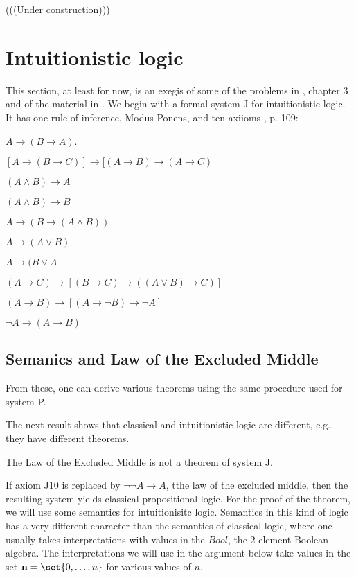 
(((Under construction)))


\section{Intuitionistic logic}

\innertableofcontents

This section, at least for now, is an exegis of some of the problems in \cite{RH}, chapter 3 and of the material in \cite{WKIL}.  We begin with a formal system J for intuitionistic logic. It has one rule of inference, Modus Ponens, and ten axiioms \cite{RH}, p. 109:

 $A \to (B \to A)$.

 $[A \to (B \to C)] \to [(A \to B) \to (A \to C) $

 $(A \land B) \to A$

 $(A \land B) \to B$

 $A \to (B \to (A \land B)) $

 $A \to (A \lor B)$

 $A \to (B \lor A$

 $(A \to C) \to [(B \to C) \to ((A \lor B) \to C)] $

 $(A \to B) \to [(A \to \neg B) \to \neg A ] $

 $\neg A \to (A \to B) $

\subsection{Semanics and Law of the Excluded Middle}

From these, one can derive various theorems using the same procedure used for system P.

The next result shows that classical  and intuitionistic logic are different, e.g., they have different theorems.

\begin{theorem}  \label{lem} The Law of the Excluded Middle is not a theorem of system J.
\end{theorem}


If axiom J10 is replaced by $\neg \neg A \to A$, tthe law of the excluded middle, then the resulting system yields classical propositional logic.
For the proof of the theorem, we will use some semantics for intuitionisitc logic.  Semantics in this kind of logic has a very different character than the semantics of classical logic, where one usually takes interpretations with values in the $Bool$, the 2-element Boolean algebra.  The interpretations we will use in the argument below take values in the set  $\mathbf{n} = \set{0, \ldots, n}$ for various values of $n$. 

